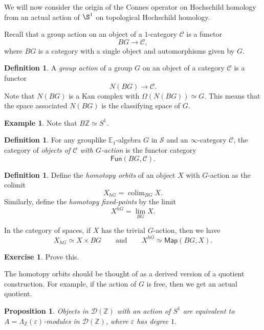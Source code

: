 \documentclass[10pt, oneside]{memoir}
\newtheorem{prop}[thm]{Proposition}
\theoremstyle{definition}
\newtheorem{defn}[thm]{Definition}
\newtheorem{exm}[thm]{Example}
\newtheorem{exer}[thm]{Exercise}
\theoremstyle{remark}
\theoremstyle{plain}
\theoremstyle{definition}
\theoremstyle{remark}
\newcommand{\Z}{\mathbb{Z}}
\newcommand{\E}{\mathbb{E}}
\newcommand{\ep}{\varepsilon}
\newcommand{\mc}[1]{\mathcal{#1}}
\newcommand{\ms}[1]{\mathsf{#1}}
\newcommand{\1}{\mathbf{1}}
\newcommand{\2}{\mathbf{2}}
\newcommand{\3}{\mathbf{3}}
\DeclareMathOperator*{\colim}{colim}
\begin{document}
We will now consider the origin of the Connes operator on Hochschild homology from an actual action of \(\S^1 \) on topological Hochschild homology.

Recall that a group action on an object of a \(1 \)-category \(\mc{C} \) is a functor
\[ BG \to \mc{C}, \]
where \(BG \) is a category with a single object and automorphisms given by \(G \).

\begin{defn}
    A \textit{group action} of a group \(G \) on an object of a category \(\mc{C} \) is a functor
    \[ N(BG) \to \mc{C}. \]
    Note that \(N(BG) \) is a Kan complex with \(\Omega(N(BG)) \simeq G \). This means that the space associated \(N(BG) \) is the classifying space of \(G \).
\end{defn}

\begin{exm}
    Note that \(B\Z \simeq S^1 \).
\end{exm}

\begin{defn}
    For any grouplike \(\E_1 \)-algebra \(G \) in \(\mc{S} \) and an \(\infty \)-category \(\mc{C} \), the category of \textit{objects of \(\mc{C} \) with \(G \)-action} is the functor category
    \[ \ms{Fun}(BG, \mc{C}). \]
\end{defn}

\begin{defn}
    Define the \textit{homotopy orbits} of an object \(X \) with \(G \)-action as the colimit
    \[ X_{hG} = \colim_{BG} X. \]
    Similarly, define the \textit{homotopy fixed-points} by the limit
    \[ X^{hG} = \lim_{BG} X. \]
\end{defn}

In the category of spaces, if \(X \) has the trivial \(G \)-action, then we have
\[ X_{hG} \simeq X \times BG \qquad \text{and} \qquad X^{hG} \simeq \ms{Map}(BG, X). \]

\begin{exer}
    Prove this.
\end{exer}

The homotopy orbits should be thought of as a derived version of a quotient construction. For example, if the action of \(G \) is free, then we get an actual quotient.

\begin{prop}
    Objects in \(\mc{D}(\Z) \) with an action of \(S^1 \) are equivalent to \(A = \Lambda_{\Z}(\ep) \)-modules in \(\mc{D}(\Z) \), where \(\ep \) has degree \(1 \).
\end{prop}
\end{document}
